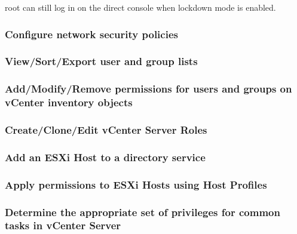 root can still log in on the direct console when lockdown mode is enabled.

\subsubsection{Configure network security policies}

\subsubsection{View/Sort/Export user and group lists}

\subsubsection{Add/Modify/Remove permissions for users and groups on vCenter inventory objects}

\subsubsection{Create/Clone/Edit vCenter Server Roles}

\subsubsection{Add an ESXi Host to a directory service}

\subsubsection{Apply permissions to ESXi Hosts using Host Profiles}

\subsubsection{Determine the appropriate set of privileges for common tasks in vCenter Server}
